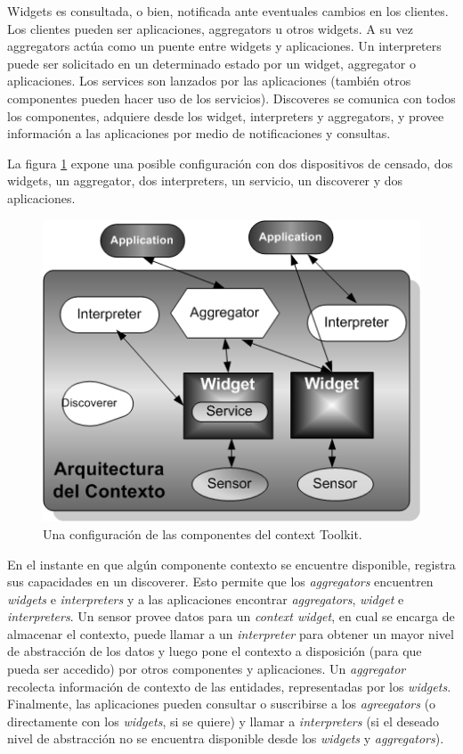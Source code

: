 Widgets es consultada, o bien, notificada ante eventuales cambios en los
clientes. Los
clientes pueden ser aplicaciones, aggregators u otros widgets. A su vez
aggregators
actúa como un puente entre widgets y aplicaciones. Un interpreters puede ser
solicitado
en un determinado estado por un widget, aggregator o aplicaciones. Los services
son
lanzados por las aplicaciones (también otros componentes pueden hacer uso de los
servicios). Discoveres se comunica con todos los componentes, adquiere desde los
widget, interpreters y aggregators, y provee información a las aplicaciones por
medio
de notificaciones y consultas.

La figura \ref{fig:deytoolkit} expone una posible configuración con dos
dispositivos de censado, dos
widgets, un aggregator, dos interpreters, un servicio, un discoverer y dos
aplicaciones.

\begin{figure}
\begin{center}
 \includegraphics [width=5 in,totalheight=4 in] {Ch1/f2.jpg}
\caption {Una configuración de las componentes del context Toolkit.}
\label{fig:deytoolkit}
\end{center}
\end{figure}


En el instante en que algún componente contexto se encuentre disponible,
registra sus
capacidades en un discoverer. Esto permite que los \textit{aggregators}
encuentren \textit{widgets} e
\textit{interpreters} y a las aplicaciones encontrar \textit{aggregators},
\textit{widget} e \textit{interpreters}. Un
sensor provee datos para un \textit{context widget}, en cual se encarga de
almacenar el
contexto, puede llamar a un \textit{interpreter} para obtener un mayor nivel de
abstracción de
los datos y luego pone el contexto a disposición (para que pueda ser accedido)
por otros
componentes y aplicaciones. Un \textit{aggregator} recolecta información de
contexto de las
entidades, representadas por los \textit{widgets}. Finalmente, las aplicaciones
pueden consultar
o suscribirse a los \textit{agreegators} (o directamente con los
\textit{widgets}, si se quiere) y llamar a
\textit{interpreters} (si el deseado nivel de abstracción no se encuentra
disponible desde los
\textit{widgets} y \textit{aggregators}).

